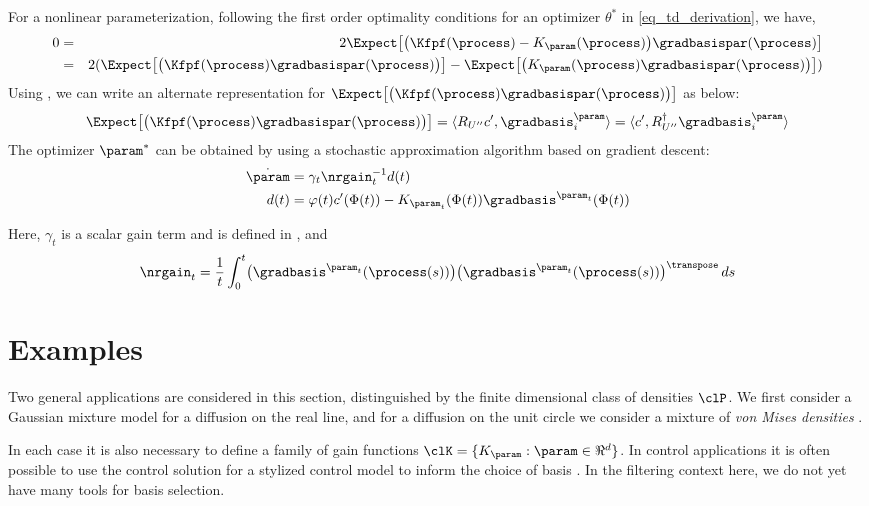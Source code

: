 For a nonlinear parameterization, following the first order optimality conditions for an optimizer $\theta^{*}$ in \eqref{eq_td_derivation}, we have,
\begin{eqnarray*}
	0 & = &2 \Expect \bigl[\bigl(\Kfpf(\process) - K_{\param}(\process)\bigr) \gradbasispar (\process)\bigr]\\
	& = & 2 (\Expect \bigl[\bigl(\Kfpf(\process)\gradbasispar (\process)\bigr)\bigr] - \Expect \bigl[\bigl(K_{\param}(\process)\gradbasispar (\process)\bigr)\bigr])
\end{eqnarray*}
Using , we can write an alternate representation for $\Expect \bigl[\bigl(\Kfpf(\process)\gradbasispar (\process)\bigr)\bigr]$ as below:
\begin{eqnarray*}
	\Expect\bigl[\bigl(\Kfpf(\process)\gradbasispar (\process)\bigr)\bigr]=\langle R_{U''}c',\gradbasis_{i}^{\param}\rangle =\langle c', R_{U''}^\dagger \gradbasis_{i}^{\param}\rangle
\end{eqnarray*}
The optimizer $\param^{*}$ can be obtained by using a stochastic approximation algorithm based on gradient descent:
\begin{equation*}
\begin{aligned}
\dot{\param}&=\gamma_{t}\nrgain_{t}^{-1} d(t) \\
d(t) & =\varphi(t)c'(\Phi(t))-K_{\param_{t}}(\Phi(t))\gradbasis^{\param_{t}}(\Phi(t))
\end{aligned}
\end{equation*}

Here, $\gamma_{t}$ is a scalar gain term and is defined in , and
\[
\nrgain_{t} =\frac{1}{t}\int_{0}^{t}\bigl(\gradbasis^{\param_{t}}(\process(s))\bigr)\bigl(\gradbasis^{\param_{t}}(\process(s))\bigr)^{\transpose}\, ds
\]

\section{Examples}
\label{s:ex}

Two general applications are considered in this section, distinguished by the finite dimensional class of densities $\clP$.  We first consider a Gaussian mixture model for a diffusion on the real line,  and for a diffusion on the unit circle we consider a mixture of \textit{von Mises densities} \cite{haspea00}.

In each case it is also necessary to define a family of gain functions $\clK = \{K_\param : \param\in\Re^d\}$.  In control applications it is often possible to use the control solution for a stylized control model to inform the choice of basis  \cite{CTCN,huachemehmeysur11}.  In the filtering context here, we do not yet have many tools for basis selection.


